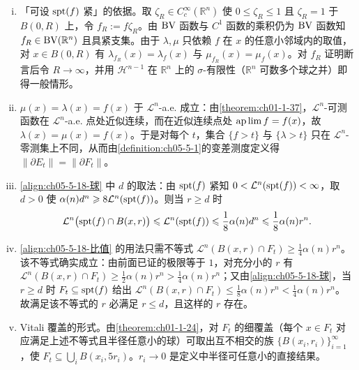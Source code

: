 \documentclass[../../main.tex]{subfiles}%
\begin{document}
\begin{remark}\label{remark:ch05-thm-5-18-论证}
\begin{enumerate}[(i)]
\item 「可设 $\operatorname{spt}(f)$ 紧」的依据。取 $\zeta_R\in C_c^{\infty}(\mathbb{R}^n)$ 使 $0\leqslant\zeta_R\leqslant1$ 且 $\zeta_R=1$ 于 $B(0,R)$ 上，令 $f_R:=f\zeta_R$。由 $\mathrm{BV}$ 函数与 $C^1$ 函数的乘积仍为 $\mathrm{BV}$ 函数知 $f_R\in\mathrm{BV}(\mathbb{R}^n)$ 且具紧支集。由于 $\lambda,\mu$ 只依赖 $f$ 在 $x$ 的任意小邻域内的取值，对 $x\in B(0,R)$ 有 $\lambda_{f_R}(x)=\lambda_f(x)$ 与 $\mu_{f_R}(x)=\mu_f(x)$。对 $f_R$ 证明断言后令 $R\to\infty$，并用 $\mathcal{H}^{n-1}$ 在 $\mathbb{R}^n$ 上的 $\sigma$-有限性（$\mathbb{R}^n$ 可数多个球之并）即得一般情形。
\item $\mu(x)=\lambda(x)=f(x)$ 于 $\mathcal{L}^n$-a.e. 成立：由\cref{theorem:ch01-1-37}，$\mathcal{L}^n$-可测函数在 $\mathcal{L}^n$-a.e. 点处近似连续，而在近似连续点处 $\operatorname*{ap\,lim} f=f(x)$，故 $\lambda(x)=\mu(x)=f(x)$。于是对每个 $t$，集合 $\{f>t\}$ 与 $\{\lambda>t\}$ 只在 $\mathcal{L}^n$-零测集上不同，从而由\cref{definition:ch05-5-1}的变差测度定义得 $\lVert\partial E_t\rVert=\lVert\partial F_t\rVert$。%
\item \eqref{align:ch05-5-18-球} 中 $d$ 的取法：由 $\operatorname{spt}(f)$ 紧知 $0<\mathcal{L}^n(\operatorname{spt}(f))<\infty$，取 $d>0$ 使 $\alpha(n)d^n\geqslant8\mathcal{L}^n(\operatorname{spt}(f))$。则当 $r\geqslant d$ 时
\begin{align*}
\mathcal{L}^n\bigl(\operatorname{spt}(f)\cap B(x,r)\bigr)\leqslant\mathcal{L}^n(\operatorname{spt}(f))\leqslant\frac18\alpha(n)d^n\leqslant\frac18\alpha(n)r^n .
\end{align*}
\item \eqref{align:ch05-5-18-比值} 的用法只需不等式 $\mathcal{L}^n(B(x,r)\cap F_t)\geqslant\frac14\alpha(n)r^n$。该不等式确实成立：由前面已证的极限等于 $1$，对充分小的 $r$ 有 $\mathcal{L}^n(B(x,r)\cap F_t)\geqslant\frac12\alpha(n)r^n>\frac14\alpha(n)r^n$；又由\eqref{align:ch05-5-18-球}，当 $r\geqslant d$ 时 $F_t\subseteq\operatorname{spt}(f)$ 给出 $\mathcal{L}^n(B(x,r)\cap F_t)\leqslant\frac18\alpha(n)r^n<\frac14\alpha(n)r^n$。故满足该不等式的 $r$ 必满足 $r\leqslant d$，且这样的 $r$ 存在。
\item Vitali 覆盖的形式。由\cref{theorem:ch01-1-24}，对 $F_t$ 的细覆盖（每个 $x\in F_t$ 对应满足上述不等式且半径任意小的球）可取出互不相交的族 $\{B(x_i,r_i)\}_{i=1}^{\infty}$，使 $F_t\subseteq\bigcup_{i}B(x_i,5r_i)$。$r_i\to0$ 是定义中半径可任意小的直接结果。 %

\end{enumerate}
\end{remark}
\end{document}
